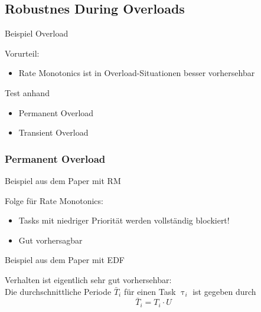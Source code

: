 \subsection{Robustnes During Overloads}

\begin{frame}{\subsecname}
	Beispiel Overload
\end{frame}

\begin{frame}{\subsecname}
	Vorurteil:
	\begin{itemize}
		\item Rate Monotonics ist in Overload-Situationen besser vorhersehbar
	\end{itemize}$ $\\\pause
	Test anhand
	\begin{itemize}
		\item Permanent Overload
		\item Transient Overload
	\end{itemize}
\end{frame}

\subsubsection{Permanent Overload}
\begin{frame}{\subsubsecname}
	Beispiel aus dem Paper mit RM
\end{frame}

\begin{frame}{\subsubsecname}
	Folge für Rate Monotonics:
	\begin{itemize}
		\item Tasks mit niedriger Priorität werden vollständig blockiert!
		\item Gut vorhersagbar
	\end{itemize}
\end{frame}


\begin{frame}{\subsubsecname}
	Beispiel aus dem Paper mit EDF
\end{frame}


\begin{frame}{\subsubsecname}
	Verhalten ist eigentlich sehr gut vorhersehbar:\\
	Die durchschnittliche Periode $\bar{T}_i$ für einen Task $\uptau_i$ ist gegeben durch
	\begin{equation}
		\bar{T}_i=T_i\cdot U
	\end{equation}
\end{frame}

